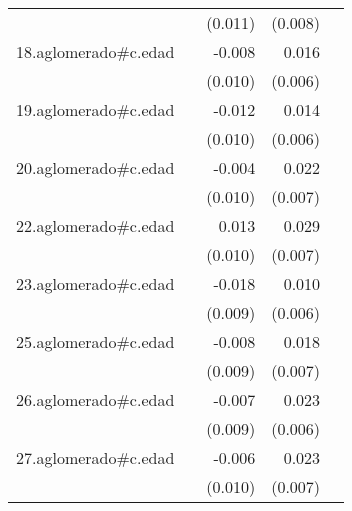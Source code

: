 {\begin{longtable}{l*{4}{D{.}{.}{-1}}}
            &                     &     (0.011)         &     (0.008)         &                     \\
\addlinespace
18.aglomerado#c.edad&                     &      -0.008         &       0.016\sym{**} &                     \\
            &                     &     (0.010)         &     (0.006)         &                     \\
\addlinespace
19.aglomerado#c.edad&                     &      -0.012         &       0.014\sym{*}  &                     \\
            &                     &     (0.010)         &     (0.006)         &                     \\
\addlinespace
20.aglomerado#c.edad&                     &      -0.004         &       0.022\sym{**} &                     \\
            &                     &     (0.010)         &     (0.007)         &                     \\
\addlinespace
22.aglomerado#c.edad&                     &       0.013         &       0.029\sym{***}&                     \\
            &                     &     (0.010)         &     (0.007)         &                     \\
\addlinespace
23.aglomerado#c.edad&                     &      -0.018\sym{*}  &       0.010         &                     \\
            &                     &     (0.009)         &     (0.006)         &                     \\
\addlinespace
25.aglomerado#c.edad&                     &      -0.008         &       0.018\sym{**} &                     \\
            &                     &     (0.009)         &     (0.007)         &                     \\
\addlinespace
26.aglomerado#c.edad&                     &      -0.007         &       0.023\sym{***}&                     \\
            &                     &     (0.009)         &     (0.006)         &                     \\
\addlinespace
27.aglomerado#c.edad&                     &      -0.006         &       0.023\sym{***}&                     \\
            &                     &     (0.010)         &     (0.007)         &                     \\

\end{longtable}}
